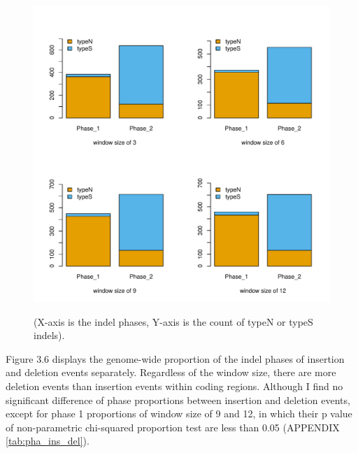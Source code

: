 \begin{figure}[H]
     \centering
     \begin{minipage}[t]{1\textwidth }
     \includegraphics[width=\linewidth, height=\linewidth]{Fig5.pdf}
     { {(X-axis is the indel phases, Y-axis is the count of typeN or typeS indels).}\par}
     \end{minipage}
\end{figure}

\indent Figure 3.6 displays the genome-wide proportion of the indel phases of insertion and deletion events separately. Regardless of the window size, there are more deletion events than insertion events within coding regions. Although I find no significant difference of phase proportions between insertion and deletion events, except for phase 1 proportions of window size of 9 and 12, in which their p value of non-parametric chi-squared proportion test are less than 0.05 (APPENDIX \ref{tab:pha_ins_del}). 

